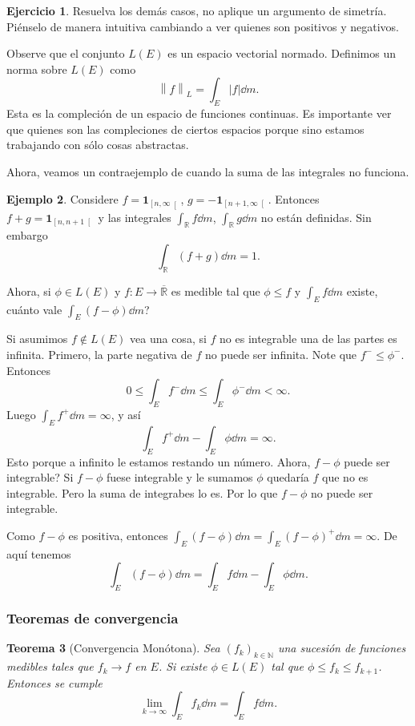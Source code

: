 \documentclass[12pt]{article}
\theoremstyle{plain}
\newtheorem{Th}{Teorema}[subsection]   %
\theoremstyle{definition}
\newtheorem{Ex}[Th]{Ejemplo}               %
\newtheorem{Ej}[Th]{Ejercicio}
\theoremstyle{remark}
\numberwithin{equation}{section}
\newcommand{\bN}{\mathbb{N}}        %
\newcommand{\bR}{\mathbb{R}}        %
\newcommand{\ind}{\mathbf{1}}       %
\renewcommand{\leq}{\leqslant}      %
\renewcommand{\:}{\colon}           %
\newcommand{\lbonj}[1]{\left\lbrack#1\right\lbrack}
\newcommand{\nm}[1]{\left\|#1\right\|} %
\begin{document}
\begin{multicols}{2}
\begin{Ej}
  Resuelva los demás casos, no aplique un argumento de simetría. Piénselo de manera intuitiva cambiando a ver quienes son positivos y negativos.
\end{Ej}

Observe que el conjunto $L(E)$ es un espacio vectorial normado. Definimos un norma sobre $L(E)$ como $$\nm{f}_L=\int_E|f|\dd m.$$
Esta es la compleción de un espacio de funciones continuas. Es importante ver que quienes son las compleciones de ciertos espacios porque sino estamos trabajando con sólo cosas abstractas.\par
Ahora, veamos un contraejemplo de cuando la suma de las integrales no funciona.
\begin{Ex}
  Considere $f=\ind_{\lbonj{n,\infty}}$, $g=-\ind_{\lbonj{n+1,\infty}}$. Entonces $f+g=\ind_{\lbonj{n,n+1}}$ y las integrales $\int_\bR f\dd m$, $\int_\bR g\dd m$ no están definidas. Sin embargo $$\int_\bR (f+g)\dd m=1.$$
\end{Ex}
Ahora, si $\phi\in L(E)$ y $f\:E\to\overline{\bR}$ es medible tal que $\phi\leq f$ y $\int_Ef\dd m$ existe, cuánto vale $\int_E(f-\phi)\dd m$?\par
Si asumimos $f\not\in L(E)$ vea una cosa, si $f$ no es integrable una de las partes es infinita. Primero, la parte negativa de $f$ no puede ser infinita. Note que $f^-\leq\phi^-$. Entonces
$$0\leq \int_Ef^-\dd m\leq \int_E\phi^-\dd m<\infty.$$
Luego $\int_Ef^+\dd m=\infty$, y así
$$\int_Ef^+\dd m-\int_E\phi\dd m=\infty.$$
Esto porque a infinito le estamos restando un número. Ahora, $f-\phi$ puede ser integrable? Si $f-\phi$ fuese integrable y le sumamos $\phi$ quedaría $f$ que no es integrable. Pero la suma de integrabes lo es. Por lo que $f-\phi$ no puede ser integrable. \par
Como $f-\phi$ es positiva, entonces $\int_E(f-\phi)\dd m=\int_E(f-\phi)^+\dd m=\infty$. De aquí tenemos
$$\int_E(f-\phi)\dd m=\int_Ef\dd m-\int_E\phi\dd m.$$

\subsubsection*{Teoremas de convergencia}

\begin{Th}[Convergencia Monótona]\label{thm:MCTLebesgue}
  Sea $(f_k)_{k\in\bN}$ una sucesión de funciones medibles tales que $f_k\to f$ en $E$. Si existe $\phi\in L(E)$ tal que $\phi\leq f_k\leq f_{k+1}$. Entonces se cumple
  $$\lim_{k\to\infty}\int_Ef_k\dd m=\int_E f\dd m.$$
\end{Th}


\end{multicols}
\end{document}
